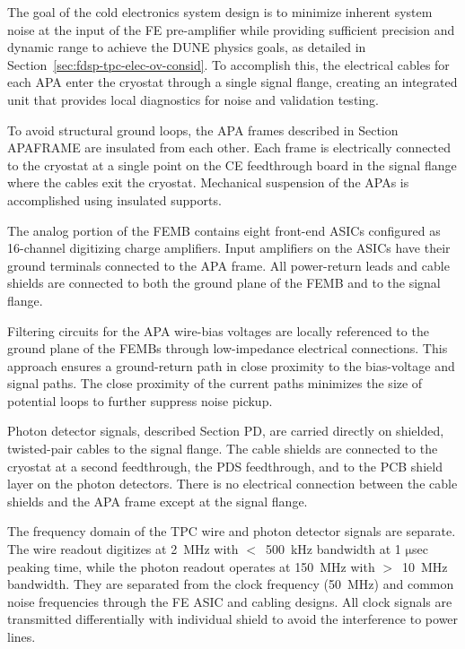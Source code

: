 The goal of the cold electronics system design is to minimize inherent system noise at the input of the FE pre-amplifier while providing sufficient precision and dynamic range to achieve the DUNE physics goals, as detailed in Section~\ref{sec:fdsp-tpc-elec-ov-consid}. To accomplish this, the electrical cables for each APA enter the cryostat through a single signal flange, creating an integrated unit that provides local diagnostics for noise and validation testing.

To avoid structural ground loops, the APA frames described in Section APAFRAME are insulated from each other. Each frame is electrically connected to the cryostat at a single point on the CE feedthrough board in the signal flange where the cables exit the cryostat. Mechanical suspension of the APAs is accomplished using insulated supports. 

The analog portion of the FEMB contains eight front-end ASICs configured as 16-channel digitizing charge amplifiers. Input amplifiers on the ASICs have their ground terminals connected to the APA frame.  All power-return leads and cable shields are connected to both the ground plane of the FEMB and to the signal flange.

Filtering circuits for the APA wire-bias voltages are locally referenced to the ground plane of the FEMBs through low-impedance electrical connections. This approach ensures a ground-return path in close proximity to the bias-voltage and signal paths. The close proximity of the current paths minimizes the size of potential loops to further suppress noise pickup.

Photon detector signals, described Section PD, are carried directly on shielded, twisted-pair cables to the signal flange. The cable shields are connected to the cryostat at a second feedthrough, the PDS feedthrough, and to the PCB shield layer on the photon detectors. There is no electrical connection between the cable shields and the APA frame except at the signal flange.

The frequency domain of the TPC wire and photon detector signals are separate. The wire readout digitizes at 2~MHz with $<$~500~kHz bandwidth at 1 $\mathrm{\mu}$sec peaking time, while the photon readout operates at 150~MHz with $>$~10~MHz bandwidth. They are separated from the clock frequency (50~MHz) and common noise frequencies through the FE ASIC and cabling designs. All clock signals are transmitted differentially with individual shield to avoid the interference to power lines.
